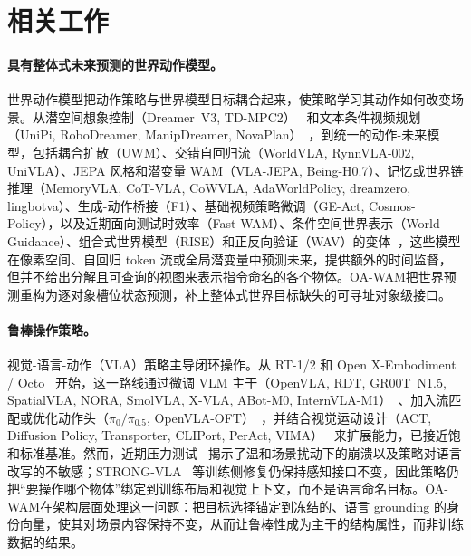 \documentclass{article}
\newcommand{\method}{OA-WAM}
\begin{document}
\section{相关工作}

\paragraph{具有整体式未来预测的世界动作模型。}
世界动作模型把动作策略与世界模型目标耦合起来，使策略学习其动作如何改变场景。从潜空间想象控制（Dreamer~V3, TD-MPC2）~\citep{dreamerv3,tdmpc2} 和文本条件视频规划（UniPi, RoboDreamer, ManipDreamer, NovaPlan）~\citep{unipi,robodreamer,manipdreamer,novaplan}，到统一的动作-未来模型，包括耦合扩散（UWM）、交错自回归流（WorldVLA, RynnVLA-002, UniVLA）、JEPA 风格和潜变量 WAM（VLA-JEPA, Being-H0.7）、记忆或世界链推理（MemoryVLA, CoT-VLA, CoWVLA, AdaWorldPolicy, dreamzero, lingbotva）、生成-动作桥接（F1）、基础视频策略微调（GE-Act, Cosmos-Policy），以及近期面向测试时效率（Fast-WAM）、条件空间世界表示（World Guidance）、组合式世界模型（RISE）和正反向验证（WAV）的变体~\citep{uwm,worldvla,rynnvla002,univla,vlajepa,beingh07,memoryvla,cotvla,cowvla,adaworldpolicy,dreamzero,lingbotva,f1vla,geact,cosmospolicy,fastwam,worldguidance,rise,wav}，这些模型在像素空间、自回归 token 流或全局潜变量中预测未来，提供额外的时间监督，但并不给出分解且可查询的视图来表示指令命名的各个物体。\method{}把世界预测重构为逐对象槽位状态预测，补上整体式世界目标缺失的可寻址对象级接口。

\paragraph{鲁棒操作策略。}
视觉-语言-动作（VLA）策略主导闭环操作。从 RT-1/2 和 Open X-Embodiment / Octo~\citep{rt1,rt2,openx,octo} 开始，这一路线通过微调 VLM 主干（OpenVLA, RDT, GR00T~N1.5, SpatialVLA, NORA, SmolVLA, X-VLA, ABot-M0, InternVLA-M1）~\citep{openvla,rdt,groot15,spatialvla,nora,smolvla,xvla,abotm0,internvlam1}、加入流匹配或优化动作头（$\pi_0/\pi_{0.5}$, OpenVLA-OFT）~\citep{pi0,pi05,openvlaoft}，并结合视觉运动设计（ACT, Diffusion Policy, Transporter, CLIPort, PerAct, VIMA）~\citep{act,diffusionpolicy,transporter,cliport,peract,vima} 来扩展能力，已接近饱和标准基准。然而，近期压力测试~\citep{liberoplus,liberopro,liberox,colosseum,robustvla} 揭示了温和场景扰动下的崩溃以及策略对语言改写的不敏感；STRONG-VLA~\citep{strongvla} 等训练侧修复仍保持感知接口不变，因此策略仍把“要操作哪个物体”绑定到训练布局和视觉上下文，而不是语言命名目标。\method{}在架构层面处理这一问题：把目标选择锚定到冻结的、语言 grounding 的身份向量，使其对场景内容保持不变，从而让鲁棒性成为主干的结构属性，而非训练数据的结果。
\end{document}
